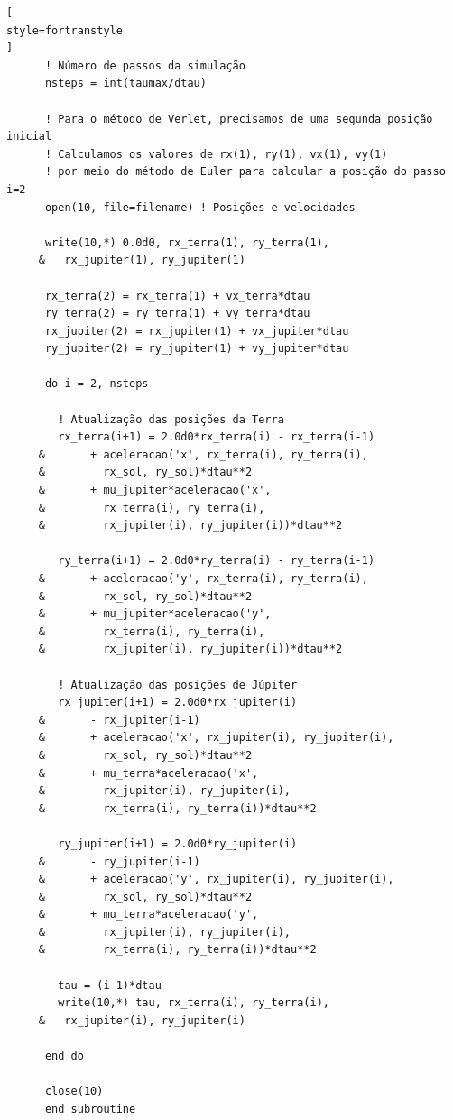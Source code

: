 \documentclass[12pt,a4paper]{article}
\begin{document}
\begin{lstlisting}[
style=fortranstyle
]
      ! Número de passos da simulação
      nsteps = int(taumax/dtau)

      ! Para o método de Verlet, precisamos de uma segunda posição inicial
      ! Calculamos os valores de rx(1), ry(1), vx(1), vy(1)
      ! por meio do método de Euler para calcular a posição do passo i=2
      open(10, file=filename) ! Posições e velocidades

      write(10,*) 0.0d0, rx_terra(1), ry_terra(1), 
     &   rx_jupiter(1), ry_jupiter(1)

      rx_terra(2) = rx_terra(1) + vx_terra*dtau
      ry_terra(2) = ry_terra(1) + vy_terra*dtau
      rx_jupiter(2) = rx_jupiter(1) + vx_jupiter*dtau
      ry_jupiter(2) = ry_jupiter(1) + vy_jupiter*dtau

      do i = 2, nsteps

        ! Atualização das posições da Terra
        rx_terra(i+1) = 2.0d0*rx_terra(i) - rx_terra(i-1)
     &       + aceleracao('x', rx_terra(i), ry_terra(i),
     &         rx_sol, ry_sol)*dtau**2
     &       + mu_jupiter*aceleracao('x',
     &         rx_terra(i), ry_terra(i),
     &         rx_jupiter(i), ry_jupiter(i))*dtau**2

        ry_terra(i+1) = 2.0d0*ry_terra(i) - ry_terra(i-1)
     &       + aceleracao('y', rx_terra(i), ry_terra(i),
     &         rx_sol, ry_sol)*dtau**2
     &       + mu_jupiter*aceleracao('y',
     &         rx_terra(i), ry_terra(i),
     &         rx_jupiter(i), ry_jupiter(i))*dtau**2

        ! Atualização das posições de Júpiter
        rx_jupiter(i+1) = 2.0d0*rx_jupiter(i)
     &       - rx_jupiter(i-1)
     &       + aceleracao('x', rx_jupiter(i), ry_jupiter(i),
     &         rx_sol, ry_sol)*dtau**2
     &       + mu_terra*aceleracao('x',
     &         rx_jupiter(i), ry_jupiter(i),
     &         rx_terra(i), ry_terra(i))*dtau**2

        ry_jupiter(i+1) = 2.0d0*ry_jupiter(i)
     &       - ry_jupiter(i-1)
     &       + aceleracao('y', rx_jupiter(i), ry_jupiter(i),
     &         rx_sol, ry_sol)*dtau**2
     &       + mu_terra*aceleracao('y',
     &         rx_jupiter(i), ry_jupiter(i),
     &         rx_terra(i), ry_terra(i))*dtau**2

        tau = (i-1)*dtau
        write(10,*) tau, rx_terra(i), ry_terra(i), 
     &   rx_jupiter(i), ry_jupiter(i)

      end do

      close(10)
      end subroutine



\end{lstlisting}
\end{document}
